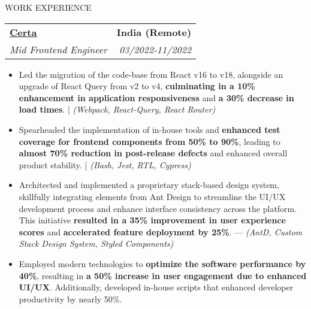 \documentclass{resume} %
\begin{document}
\vspace{-5pt}
\begin{rSection}{WORK EXPERIENCE}

   \begin{tabularx}{\textwidth}{@{}X r}
      \textbf{\href{https://www.getcerta.com/}{Certa}} & \textbf{India (Remote)} \\
      \textit{Mid Frontend Engineer} & \textit{03/2022-11/2022} \\
   \end{tabularx}

   \begin{minipage}[t]{1\textwidth}
      \begin{itemize}[left=0pt, nosep, before=\vspace{-0.5\baselineskip}]

\item \small Led the migration of the code-base from React v16 to v18, alongside an upgrade of React Query from v2 to v4, \textbf{culminating in a 10\% enhancement in application responsiveness} and \textbf{a 30\% decrease in load times}. | \textit{(Webpack, React-Query, React Router)}
\item \small Spearheaded the implementation of in-house tools and \textbf{enhanced test coverage for frontend components from 50\% to 90\%}, leading to \textbf{almost 70\% reduction in post-release defects} and enhanced overall product stability. | \textit{(Bash, Jest, RTL, Cypress)}
\item \small Architected and implemented a proprietary stack-based design system, skillfully integrating elements from Ant Design to streamline the UI/UX development process and enhance interface consistency across the platform. This initiative \textbf{resulted in a 35\% improvement in user experience scores} and \textbf{accelerated feature deployment by 25\%}. — \textit{(AntD, Custom Stack Design System, Styled Components)}
\item \small Employed modern technologies to \textbf{optimize the software performance by 40\%}, resulting in \textbf{a 50\% increase in user engagement due to enhanced UI/UX}. Additionally, developed in-house scripts that enhanced developer productivity by nearly 50\%.

         
      \end{itemize}
   \end{minipage}


\end{rSection}
\end{document}
